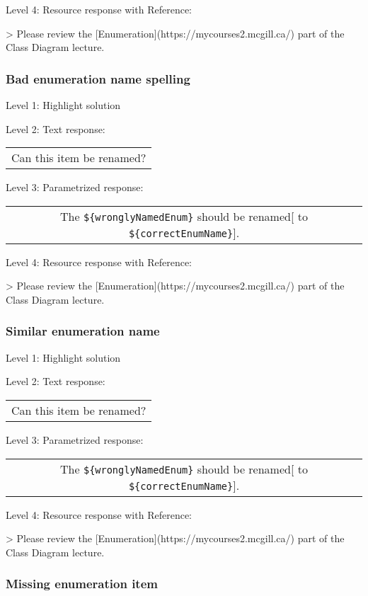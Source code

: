 \noindent Level 4: Resource response with Reference:

> Please review the [Enumeration](https://mycourses2.mcgill.ca/) part of the Class Diagram lecture.


\subsubsection{Bad enumeration name spelling}

\noindent Level 1: Highlight solution \medskip

\noindent Level 2: Text response: \medskip

\begin{tabular}{|c}
Can this item be renamed?
\end{tabular} \medskip

\noindent Level 3: Parametrized response: \medskip

\begin{tabular}{|c}
The \verb|${wronglyNamedEnum}| should be renamed[ to \verb|${correctEnumName}|].
\end{tabular} \medskip

\noindent Level 4: Resource response with Reference:

> Please review the [Enumeration](https://mycourses2.mcgill.ca/) part of the Class Diagram lecture.


\subsubsection{Similar enumeration name}

\noindent Level 1: Highlight solution \medskip

\noindent Level 2: Text response: \medskip

\begin{tabular}{|c}
Can this item be renamed?
\end{tabular} \medskip

\noindent Level 3: Parametrized response: \medskip

\begin{tabular}{|c}
The \verb|${wronglyNamedEnum}| should be renamed[ to \verb|${correctEnumName}|].
\end{tabular} \medskip

\noindent Level 4: Resource response with Reference:

> Please review the [Enumeration](https://mycourses2.mcgill.ca/) part of the Class Diagram lecture.


\subsubsection{Missing enumeration item}

